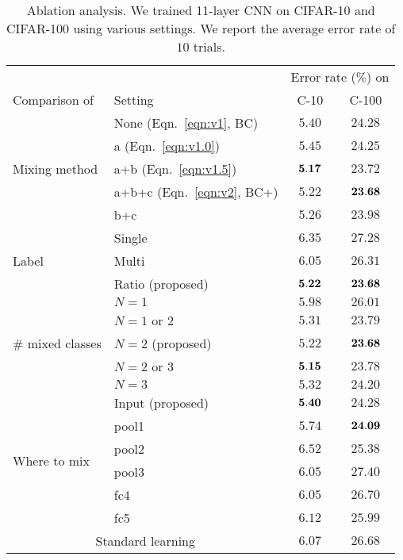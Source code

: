 \documentclass[10pt,twocolumn,letterpaper]{article}
\begin{document}
\begin{table}
	\centering
	\caption{Ablation analysis. We trained 11-layer CNN on CIFAR-10 and CIFAR-100 using various settings. We report the average error rate of $10$ trials.}
	\label{tab:ablation}
	\vspace{2mm}
	\small
	\begin{tabular}{llcc}
		\toprule
		&& \multicolumn{2}{c}{Error rate ($\%$) on} \\
		Comparison of & Setting & C-10 & C-100 \\
		\midrule
		\multirow{5}{*}{Mixing method}
					& None (Eqn.~\ref{eqn:v1}, BC)    & $5.40$ & $24.28 $ \\
					& a (Eqn.~\ref{eqn:v1.0})          & $5.45$ & $24.25 $ \\
					& a+b (Eqn.~\ref{eqn:v1.5})       & ${\bf 5.17} $ &$23.72$ \\
					& a+b+c (Eqn.~\ref{eqn:v2}, BC+)   & $5.22$ & ${\bf 23.68}$ \\
					& b+c          & $5.26$ &$23.98$ \\
		\midrule
		\multirow{3}{*}{Label} & Single	 		& $6.35$ & $27.28$ \\
						 & Multi			& $6.05$ & $26.31$ \\
			 			& Ratio (proposed)	& ${\bf 5.22}$ & ${\bf 23.68}$ \\
		\midrule
		\multirow{5}{*}{\# mixed classes} & $N=1$ 		      & $5.98$ & $26.01$ \\
								     & $N=1$ or $2$ 	      & $5.31$ & $23.79$ \\
	 							     & $N=2$ (proposed)  & $5.22$ & ${\bf 23.68}$ \\
								     & $N=2$ or $3$ 	     & ${\bf 5.15}$ & $23.78$ \\
								     & $N=3$  		      & $5.32$ & $24.20$ \\
		\midrule
		\multirow{6}{*}{Where to mix} 	& Input (proposed)   & ${\bf 5.40}$ & $24.28$ \\
								& pool1 		        & $5.74$ & ${\bf 24.09} $ \\
								& pool2 			& $6.52$ & $25.38 $ \\
								& pool3 			& $6.05$ & $27.40 $ \\
								& fc4 			& $6.05$ & $26.70 $ \\
								& fc5				& $6.12$ & $25.99 $ \\
		\midrule
		\midrule
		\multicolumn{2}{c}{Standard learning} & $6.07$ & $26.68$ \\
		\bottomrule
	\end{tabular}
	\vspace{-3mm}
\end{table}
\end{document}

